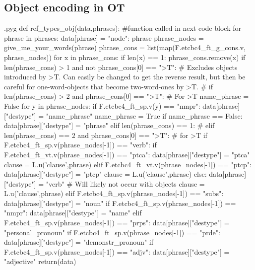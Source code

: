 \documentclass{report}
\makeatletter
\newenvironment{python}{%
  \VerbatimEnvironment
  \minted@resetoptions
  \setkeys{minted@opt}{}
      \begin{VerbatimOut}{\jobname.pyg}}
{%
      \end{VerbatimOut}
      \minted@pygmentize{python}
      \DeleteFile{\jobname.pyg}}
\makeatother
\begin{document}
\subsection{Object encoding in OT}

\begin{python}
def ref_types_obj(data,phrases): #function called in next code block
    for phrase in phrases:
        data[phrase] = {"node": phrase}
        phrase_nodes = give_me_your_words(phrase)
        phrase_cons = list(map(F.etcbc4_ft_g_cons.v, phrase_nodes))
        for x in phrase_cons:
            if len(x) == 1:
                phrase_cons.remove(x)
        if len(phrase_cons) > 1 and not phrase_cons[0] == ">T": # Excludes objects introduced by >T. Can easily be changed to get the reverse result, but then be careful for one-word-objects that become two-word-ones by >T.
#       if len(phrase_cons) > 2 and phrase_cons[0] == ">T": # For >T
            name_phrase = False
            for y in phrase_nodes:
                if F.etcbc4_ft_sp.v(y) == "nmpr":
                    data[phrase]["destype"] = "name_phrase"
                    name_phrase = True
            if name_phrase == False:
                data[phrase]["destype"] = "phrase"
        elif len(phrase_cons) == 1:
#       elif len(phrase_cons) == 2 and phrase_cons[0] == ">T": # for >T
            if F.etcbc4_ft_sp.v(phrase_nodes[-1]) == "verb":
                if F.etcbc4_ft_vt.v(phrase_nodes[-1]) == "ptca":
                    data[phrase]["destype"] = "ptca"
                    clause = L.u('clause',phrase)
                elif F.etcbc4_ft_vt.v(phrase_nodes[-1]) == "ptcp":
                    data[phrase]["destype"] = "ptcp"
                    clause = L.u('clause',phrase)
                else:
                    data[phrase]["destype"] = "verb" # Will likely not occur with objects
                    clause = L.u('clause',phrase)
            elif F.etcbc4_ft_sp.v(phrase_nodes[-1]) == "subs":
                data[phrase]["destype"] = "noun"
            if F.etcbc4_ft_sp.v(phrase_nodes[-1]) == "nmpr":
                data[phrase]["destype"] = "name"
            elif F.etcbc4_ft_sp.v(phrase_nodes[-1]) == "prps":
                data[phrase]["destype"] = "personal_pronoun"
            if F.etcbc4_ft_sp.v(phrase_nodes[-1]) == "prde":
                data[phrase]["destype"] = "demonstr_pronoun"
            if F.etcbc4_ft_sp.v(phrase_nodes[-1]) == "adjv":
                data[phrase]["destype"] = "adjective"
    return(data)
                    

\end{python}
\end{document}
